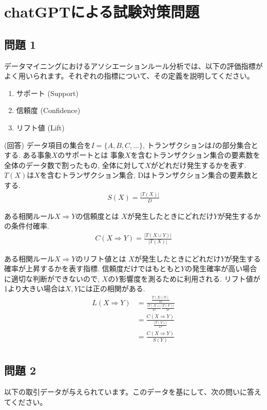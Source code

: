 \documentclass[dvipdfmx, 10pt]{jsarticle}
\begin{document}
\section*{chatGPTによる試験対策問題}
\subsection*{問題 1}
データマイニングにおけるアソシエーションルール分析では、以下の評価指標がよく用いられます。それぞれの指標について、その定義を説明してください。

\begin{enumerate}
    \item サポート (Support)
    \item 信頼度 (Confidence)
    \item リフト値 (Lift)
\end{enumerate}

(回答)
データ項目の集合を\(I = \{A, B, C, \dots \}\), トランザクションは\(I\)の部分集合とする. 
ある事象\(X\)のサポートとは
事象\(X\)を含むトランザクション集合の要素数を全体のデータ数で割ったもの, 全体に対して\(X\)がどれだけ発生するかを表す. 
\(T(X)\)は\(X\)を含むトランザクション集合, Dはトランザクション集合の要素数とする. 
\begin{align*}
    S(X) = \frac{|T(X)|}{D}
\end{align*}

ある相関ルール\(X \Rightarrow Y\)の信頼度とは
\(X\)が発生したときにどれだけ\(Y\)が発生するかの条件付確率. 
\begin{align*}
    C(X \Rightarrow Y) = \frac{|T(X \cup Y)|}{|T(X)|}
\end{align*}

ある相関ルール\(X \Rightarrow Y\)のリフト値とは
\(X\)が発生したときにどれだけ\(Y\)が発生する確率が上昇するかを表す指標. 
信頼度だけではもともと\(Y\)の発生確率が高い場合に適切な判断ができないので, \(X\)の\(Y\)影響度を測るために利用される. 
リフト値が1より大きい場合は\(X, Y\)には正の相関がある. 
\begin{align*}
    L(X \Rightarrow Y) 
    &= \frac{\frac{T(X \cup Y)}{D}}{\frac{|T(X)|}{D} \frac{|T(Y)|}{D}} \\
    &= \frac{C(X \Rightarrow Y)}{\frac{|T(Y)|}{D}} \\
    &= \frac{C(X \Rightarrow Y)}{S(Y)} \\
\end{align*}

\subsection*{問題 2}
以下の取引データが与えられています。このデータを基にして、次の問いに答えてください。
\end{document}
